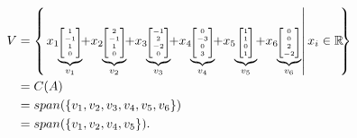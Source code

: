\begin{align*}
V&=\tiny{\left\{\left.
	x_1 \hspace*{-.1cm} \underbrace{\begin{bmatrix} 1  \\-1  \\	1 \\0 	\end{bmatrix}}_{v_1}\hspace*{-.1cm} 
	+ x_2\hspace*{-.1cm}\underbrace{\begin{bmatrix} 2  \\-1  \\	1 \\0 	\end{bmatrix}}_{v_2}\hspace*{-.1cm} 
	+ x_3\hspace*{-.1cm}\underbrace{\begin{bmatrix} -1  \\2  \\	-2 \\0 	\end{bmatrix}}_{v_3}\hspace*{-.1cm} 
	+ x_4 \hspace*{-.1cm}\underbrace{\begin{bmatrix} 0   \\-3  \\   0  \\3 	\end{bmatrix}}_{v_4}\hspace*{-.1cm} 
	+x_5\hspace*{-.1cm}\underbrace{\begin{bmatrix} 1   \\1 \\   0  \\1	\end{bmatrix}}_{v_5}\hspace*{-.1cm} 
	+x_6\hspace*{-.1cm} \underbrace{\begin{bmatrix} 0   \\0  \\   2  \\-2 	\end{bmatrix}}_{v_6}
	\right|  x_i \in \mathbb{R}\hspace*{-.1cm} 
	\right\}}\\
&=C(A)\\
&=span(\{v_1,v_2,v_3,v_4,v_5,v_6\})\\
&=span(\{v_1,v_2,v_4,v_5\}).
\end{align*}

